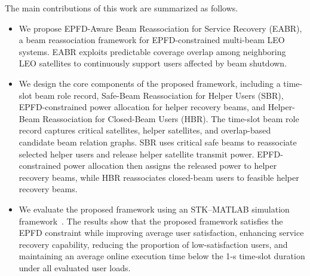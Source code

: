 The main contributions of this work are summarized as follows.

\begin{itemize}[leftmargin=*,labelindent=1.5em,nosep]
  \item We propose EPFD-Aware Beam Reassociation for Service Recovery (EABR), a beam reassociation framework for EPFD-constrained multi-beam LEO systems. EABR exploits predictable coverage overlap among neighboring LEO satellites to continuously support users affected by beam shutdown.

  \item We design the core components of the proposed framework, including a time-slot beam role record, Safe-Beam Reassociation for Helper Users (SBR), EPFD-constrained power allocation for helper recovery beams, and Helper-Beam Reassociation for Closed-Beam Users (HBR). The time-slot beam role record captures critical satellites, helper satellites, and overlap-based candidate beam relation graphs. SBR uses critical safe beams to reassociate selected helper users and release helper satellite transmit power. EPFD-constrained power allocation then assigns the released power to helper recovery beams, while HBR reassociates closed-beam users to feasible helper recovery beams.

  \item We evaluate the proposed framework using an STK--MATLAB simulation framework~\cite{agi2023stk,mathworks2023matlab}. The results show that the proposed framework satisfies the EPFD constraint while improving average user satisfaction, enhancing service recovery capability, reducing the proportion of low-satisfaction users, and maintaining an average online execution time below the 1-s time-slot duration under all evaluated user loads.
\end{itemize}
